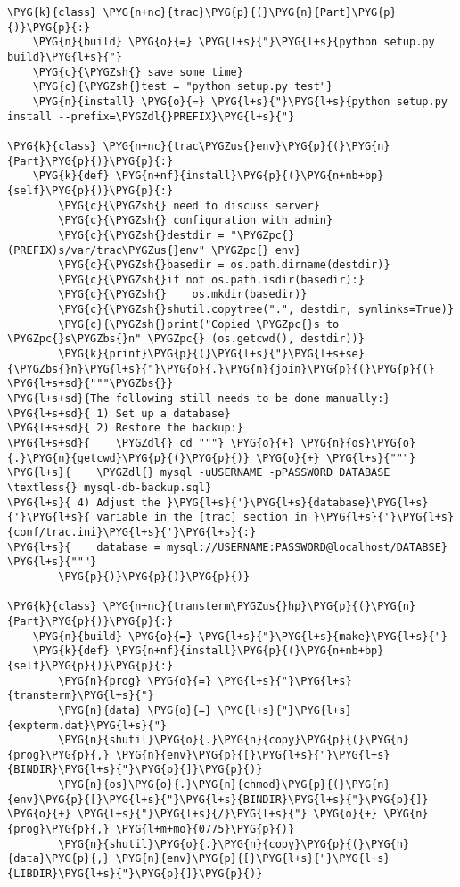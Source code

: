 \begin{Verbatim}[commandchars=\\\{\}]
\PYG{k}{class} \PYG{n+nc}{trac}\PYG{p}{(}\PYG{n}{Part}\PYG{p}{)}\PYG{p}{:}
    \PYG{n}{build} \PYG{o}{=} \PYG{l+s}{"}\PYG{l+s}{python setup.py build}\PYG{l+s}{"}
    \PYG{c}{\PYGZsh{} save some time}
    \PYG{c}{\PYGZsh{}test = "python setup.py test"}
    \PYG{n}{install} \PYG{o}{=} \PYG{l+s}{"}\PYG{l+s}{python setup.py install --prefix=\PYGZdl{}PREFIX}\PYG{l+s}{"}

\PYG{k}{class} \PYG{n+nc}{trac\PYGZus{}env}\PYG{p}{(}\PYG{n}{Part}\PYG{p}{)}\PYG{p}{:}
    \PYG{k}{def} \PYG{n+nf}{install}\PYG{p}{(}\PYG{n+nb+bp}{self}\PYG{p}{)}\PYG{p}{:}
        \PYG{c}{\PYGZsh{} need to discuss server}
        \PYG{c}{\PYGZsh{} configuration with admin}
        \PYG{c}{\PYGZsh{}destdir = "\PYGZpc{}(PREFIX)s/var/trac\PYGZus{}env" \PYGZpc{} env}
        \PYG{c}{\PYGZsh{}basedir = os.path.dirname(destdir)}
        \PYG{c}{\PYGZsh{}if not os.path.isdir(basedir):}
        \PYG{c}{\PYGZsh{}    os.mkdir(basedir)}
        \PYG{c}{\PYGZsh{}shutil.copytree(".", destdir, symlinks=True)}
        \PYG{c}{\PYGZsh{}print("Copied \PYGZpc{}s to \PYGZpc{}s\PYGZbs{}n" \PYGZpc{} (os.getcwd(), destdir))}
        \PYG{k}{print}\PYG{p}{(}\PYG{l+s}{"}\PYG{l+s+se}{\PYGZbs{}n}\PYG{l+s}{"}\PYG{o}{.}\PYG{n}{join}\PYG{p}{(}\PYG{p}{(}
\PYG{l+s+sd}{"""\PYGZbs{}}
\PYG{l+s+sd}{The following still needs to be done manually:}
\PYG{l+s+sd}{ 1) Set up a database}
\PYG{l+s+sd}{ 2) Restore the backup:}
\PYG{l+s+sd}{    \PYGZdl{} cd """} \PYG{o}{+} \PYG{n}{os}\PYG{o}{.}\PYG{n}{getcwd}\PYG{p}{(}\PYG{p}{)} \PYG{o}{+} \PYG{l+s}{"""}
\PYG{l+s}{    \PYGZdl{} mysql -uUSERNAME -pPASSWORD DATABASE \textless{} mysql-db-backup.sql}
\PYG{l+s}{ 4) Adjust the }\PYG{l+s}{'}\PYG{l+s}{database}\PYG{l+s}{'}\PYG{l+s}{ variable in the [trac] section in }\PYG{l+s}{'}\PYG{l+s}{conf/trac.ini}\PYG{l+s}{'}\PYG{l+s}{:}
\PYG{l+s}{    database = mysql://USERNAME:PASSWORD@localhost/DATABSE}
\PYG{l+s}{"""}
        \PYG{p}{)}\PYG{p}{)}\PYG{p}{)}

\PYG{k}{class} \PYG{n+nc}{transterm\PYGZus{}hp}\PYG{p}{(}\PYG{n}{Part}\PYG{p}{)}\PYG{p}{:}
    \PYG{n}{build} \PYG{o}{=} \PYG{l+s}{"}\PYG{l+s}{make}\PYG{l+s}{"}
    \PYG{k}{def} \PYG{n+nf}{install}\PYG{p}{(}\PYG{n+nb+bp}{self}\PYG{p}{)}\PYG{p}{:}
        \PYG{n}{prog} \PYG{o}{=} \PYG{l+s}{"}\PYG{l+s}{transterm}\PYG{l+s}{"}
        \PYG{n}{data} \PYG{o}{=} \PYG{l+s}{"}\PYG{l+s}{expterm.dat}\PYG{l+s}{"}
        \PYG{n}{shutil}\PYG{o}{.}\PYG{n}{copy}\PYG{p}{(}\PYG{n}{prog}\PYG{p}{,} \PYG{n}{env}\PYG{p}{[}\PYG{l+s}{"}\PYG{l+s}{BINDIR}\PYG{l+s}{"}\PYG{p}{]}\PYG{p}{)}
        \PYG{n}{os}\PYG{o}{.}\PYG{n}{chmod}\PYG{p}{(}\PYG{n}{env}\PYG{p}{[}\PYG{l+s}{"}\PYG{l+s}{BINDIR}\PYG{l+s}{"}\PYG{p}{]} \PYG{o}{+} \PYG{l+s}{"}\PYG{l+s}{/}\PYG{l+s}{"} \PYG{o}{+} \PYG{n}{prog}\PYG{p}{,} \PYG{l+m+mo}{0775}\PYG{p}{)}
        \PYG{n}{shutil}\PYG{o}{.}\PYG{n}{copy}\PYG{p}{(}\PYG{n}{data}\PYG{p}{,} \PYG{n}{env}\PYG{p}{[}\PYG{l+s}{"}\PYG{l+s}{LIBDIR}\PYG{l+s}{"}\PYG{p}{]}\PYG{p}{)}


\end{Verbatim}
